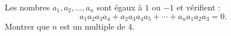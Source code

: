 Les nombres $a_1, a_2, \ldots, a_n$ sont égaux à $1$ ou $-1$ et vérifient :
\[
a_1a_2a_3a_4 + a_2a_3a_4a_5 + \cdots + a_na_1a_2a_3 = 0.
\]
Montrer que $n$ est un multiple de $4$.

